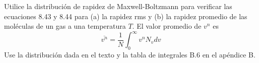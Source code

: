\item Utilice la distribución de rapidez de Maxwell-Boltzmann para verificar las ecuaciones 8.43 y 8.44 para (a) la rapidez rms y (b) la rapidez promedio de las moléculas de un gas a una temperatura $T$. El valor promedio de $v^n$ es
$$ \overline{v^n} = \frac{1}{N} \int_0^\infty v^n N_v dv $$
Use la distribución dada en el texto y la tabla de integrales B.6 en el apéndice B.
